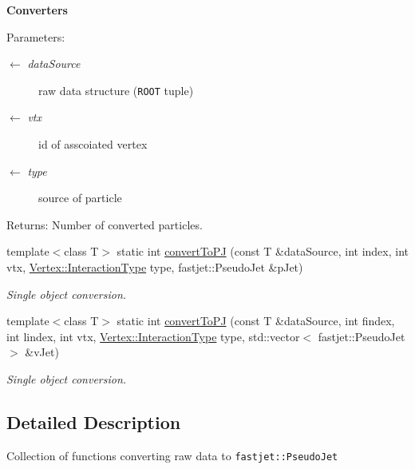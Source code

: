 \begin{Indent}{\bf Converters}
{\begin{Desc}
\item[Parameters:]
\begin{description}
\item[\mbox{$\leftarrow$} {\em data\-Source}]raw data structure ({\tt ROOT} tuple) \item[\mbox{$\leftarrow$} {\em vtx}]id of asscoiated vertex \item[\mbox{$\leftarrow$} {\em type}]source of particle\end{description}
\end{Desc}
\begin{Desc}
\item[Returns:]Number of converted particles. \end{Desc}
}\begin{CompactItemize}
\item 
template$<$class T$>$ static int \hyperlink{structConverters_37bc9dc22fcd3559eb5bcb2cfefdb8ae}{convert\-To\-PJ} (const T \&data\-Source, int index, int vtx, \hyperlink{classVertex_0d80a5c5ed3bd9be72a325aa448eca25}{Vertex::Interaction\-Type} type, fastjet::Pseudo\-Jet \&p\-Jet)
\begin{CompactList}\small\item\em Single object conversion. \item\end{CompactList}\item 
template$<$class T$>$ static int \hyperlink{structConverters_fd8fb82b02a0287cf8308b76bb69b4ff}{convert\-To\-PJ} (const T \&data\-Source, int findex, int lindex, int vtx, \hyperlink{classVertex_0d80a5c5ed3bd9be72a325aa448eca25}{Vertex::Interaction\-Type} type, std::vector$<$ fastjet::Pseudo\-Jet $>$ \&v\-Jet)
\begin{CompactList}\small\item\em Single object conversion. \item\end{CompactList}\end{CompactItemize}
\end{Indent}


\subsection{Detailed Description}
Collection of functions converting raw data to {\tt fastjet::Pseudo\-Jet} 



